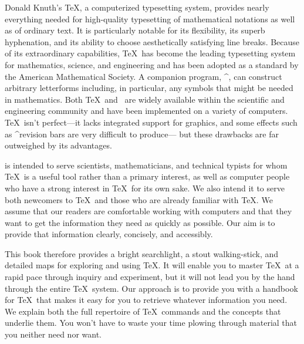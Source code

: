 


{\tighten
Donald Knuth's \TeX, a computerized typesetting system,
provides nearly everything
needed for high-quality typesetting of mathematical
notations as well as of ordinary text.
It is particularly notable for its flexibility, its superb hyphenation, and its
ability to choose aesthetically satisfying line breaks.
Because
of its extraordinary capabilities, \TeX\ has become the leading typesetting
system for mathematics, science, and engineering and has been adopted as
a standard by the American Mathematical Society.  A companion program,
^{\Metafont},
can construct arbitrary letterforms including, in particular, any symbols that
might be needed in mathematics.
Both \TeX\ and \Metafont\ are widely available within the
scientific and engineering community and have been implemented on a
variety of computers.
\TeX\ isn't perfect---it lacks integrated support for graphics, and
some effects such as ^{revision bars} are very difficult to produce---%
but these drawbacks are far outweighed by its advantages.
\par}

\thisbook\/ is intended to serve scientists, mathematicians, and
technical typists for whom \TeX\ is a useful tool rather than a primary
interest, as well as computer people who have a strong interest in \TeX\
for its own sake.  We also intend it to serve both newcomers to \TeX\
and those who are already familiar with \TeX.  We assume that our
readers are comfortable working with computers and that they want to get
the information they need as quickly as possible.  Our aim is to provide
that information clearly, concisely, and accessibly.

{\tighten This book therefore provides a bright searchlight, a stout
walking-stick, and detailed maps for exploring and using \TeX.  It will
enable you to master \TeX\ at a rapid pace through inquiry and
experiment, but it will not lead you by the hand through the entire
\TeX\ system.  Our approach is to provide you with a handbook for \TeX\
that makes it easy for you to retrieve whatever information you need.
We explain both the full repertoire of \TeX\ commands and the concepts
that underlie them.  You won't have to waste your time plowing through
material that you neither need nor want.  \par}


